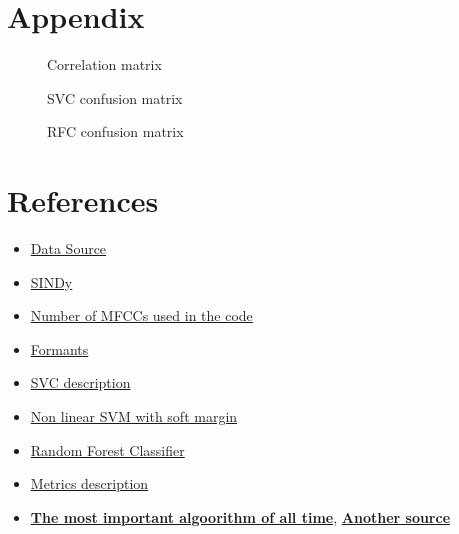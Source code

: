 \documentclass{article}
\begin{document}
\section*{Appendix}
\setcounter{page}{12}

\begin{figure}[htbp]
    \centering
    
    \caption{Correlation matrix}
    \label{fig:enter-label}
\end{figure}

\begin{figure}
    \centering
    
    \caption{SVC confusion matrix}
    \label{fig:enter-label}
\end{figure}

\begin{figure}
    \centering
    
    \caption{RFC confusion matrix}
    \label{fig:enter-label}
\end{figure}

\newpage
\section*{References}
\begin{itemize}
    \item \href{https://huggingface.co/datasets/common_language}{Data Source}

    \item \href{https://www.youtube.com/playlist?list=PLkjmwL-pF6dzj5aSN2sa4ZNm92G9b4ca2}{SINDy}
    
    \item \href{https://ietresearch.onlinelibrary.wiley.com/doi/full/10.1049/tje2.12082#:~:text=All\%20performance\%20metrics\%20gave\%20the,studies\%20use\%20only\%2013\%20MFCCs}{Number of MFCCs used in the code}

    \item \href{https://corpus.eduhk.hk/english_pronunciation/index.php/2-2-formants-of-vowels/}{Formants}
    
    \item \href{https://scikit-learn.org/stable/modules/generated/sklearn.svm.SVC.html}{SVC description}
    
    \item \href{https://scikit-learn.org/stable/modules/svm.html#svm-kernels}{Non linear SVM with soft margin}
    
    \item \href{https://scikit-learn.org/stable/modules/generated/sklearn.ensemble.RandomForestClassifier.html}{Random Forest Classifier}

    \item \href{https://www.v7labs.com/blog/f1-score-guide}{Metrics description}

    \item \href{https://youtu.be/nmgFG7PUHfo?si=emVgNvaE7BQpk3al}{\textbf{The most important algoorithm of all time}}, \href{https://bootcamp.uxdesign.cc/the-most-important-algorithm-of-all-time-9ff1659ff3ef}{\textbf{Another source}}

\end{itemize}
\end{document}
